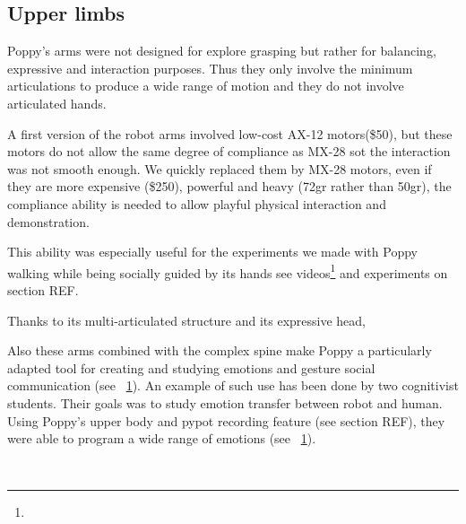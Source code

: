 \subsection{Upper limbs} %

Poppy's arms were not designed for explore grasping but rather for balancing, expressive and interaction purposes. Thus they only involve the minimum articulations to produce a wide range of motion and they do not involve articulated hands.

A first version of the robot arms involved low-cost AX-12 motors(\$50), but these motors do not allow the same degree of compliance as MX-28 sot the interaction was not smooth enough. We quickly replaced them by MX-28 motors, even if they are more expensive (\$250), powerful and heavy (72gr rather than 50gr), the compliance ability is needed to allow playful physical interaction and demonstration.

This ability was especially useful for the experiments we made with Poppy walking while being socially guided by its hands see videos\footnote{} and experiments on section REF.

Thanks to its multi-articulated structure and its expressive head,

Also these arms combined with the complex spine make Poppy a particularly adapted tool for creating and studying emotions and gesture social communication (see \figurename~\ref{fig:TER_cognitic}). An example of such use has been done by two cognitivist students. Their goals was to study emotion transfer between robot and human. Using Poppy's upper body and pypot recording feature (see section REF), they were able to program a wide range of emotions (see \figurename~\ref{fig:TER_cognitic}).


\begin{figure}[tb]
\centering
    \hfil
    \\
    \hfil
    \caption{}
    \label{fig:TER_cognitic}
\end{figure}


%




